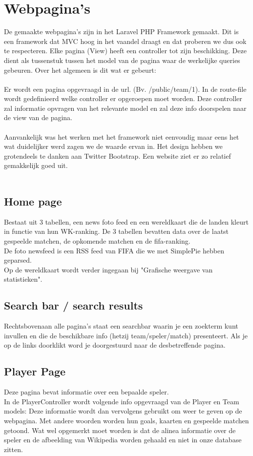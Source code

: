 \documentclass[11pt, a4paper]{article}
\begin{document}
\section{Webpagina's}
De gemaakte webpagina's zijn in het Laravel PHP Framework gemaakt. Dit is een framework dat MVC hoog in het vaandel draagt en dat proberen we dus ook te respecteren.
Elke pagina (View) heeft een controller tot zijn beschikking. Deze dient als tussenstuk tussen het model van de pagina waar de werkelijke queries gebeuren. Over het algemeen is dit wat er gebeurt:
\\
\\
Er wordt een pagina opgevraagd in de url. (Bv. /public/team/1). In de route-file wordt gedefinieerd welke controller er opgeroepen moet worden. Deze controller zal informatie opvragen van het
relevante model en zal deze info doorspelen naar de view van de pagina.
\\
\\
Aanvankelijk was het werken met het framework niet eenvoudig maar eens het wat duidelijker werd zagen we de waarde ervan in.
Het design hebben we grotendeels te danken aan Twitter Bootstrap. Een website ziet er zo relatief gemakkelijk goed uit.
\\
\\
\subsection{Home page}
Bestaat uit 3 tabellen, een news foto feed en een wereldkaart die de landen kleurt in functie van hun WK-ranking.
De 3 tabellen bevatten data over de laatst gespeelde matchen, de opkomende matchen en de fifa-ranking.
\\
De foto newsfeed is een RSS feed van FIFA die we met SimplePie hebben geparsed.
\\
Op de wereldkaart wordt verder ingegaan bij "Grafische weergave van statistieken".
\subsection{Search bar / search results}
Rechtsbovenaan alle pagina's staat een searchbar waarin je een zoekterm kunt invullen en die de beschikbare info (hetzij team/speler/match) presenteert. Als je op de links doorklikt word je doorgestuurd naar de desbetreffende pagina.

\subsection{Player Page}
Deze pagina bevat informatie over een bepaalde speler.
\\
In de PlayerController wordt volgende info opgevraagd van de Player en Team models:
Deze informatie wordt dan vervolgens gebruikt om weer te geven op de webpagina. Met andere woorden worden hun goals, kaarten en gespeelde matchen getoond. Wat wel opgemerkt moet worden is dat de alinea informatie over de speler en de afbeelding van Wikipedia worden gehaald en niet in onze database zitten.
\end{document}
